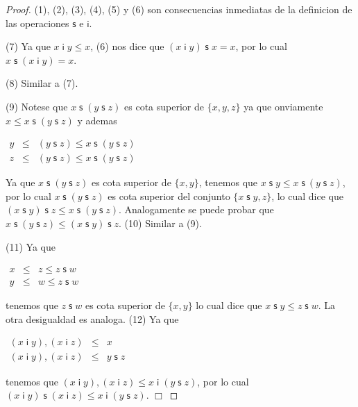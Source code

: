   \begin{proof}
    (1), (2), (3), (4), (5) y (6) son consecuencias inmediatas de la definicion de las operaciones \(\mathsf{s}\) e \(\mathsf{i}\).

    (7) Ya que \(x\mathsf{\;i\;}y\leq x\), (6) nos dice que \((x\mathsf{\;i\;}y)\; \mathsf{s}\;x=x\), por lo cual \(x\;\mathsf{s}\;(x\mathsf{\;i\;}y)=x\).

    (8) Similar a (7).

    (9) Notese que \(x\;\mathsf{s}\;(y\;\mathsf{s}\;z)\) es cota superior de \( \{x,y,z\}\) ya que onviamente \(x\leq x\;\mathsf{s}\;(y\;\mathsf{s}\;z)\) y ademas

    \(\displaystyle \begin{array}{rcl} y & \leq & (y\;\mathsf{s}\;z)\leq x\;\mathsf{s}\;(y\;\mathsf{s}\;z) \\ z & \leq & (y\;\mathsf{s}\;z)\leq x\;\mathsf{s}\;(y\;\mathsf{s}\;z) \end{array} \)

    Ya que \(x\;\mathsf{s}\;(y\;\mathsf{s}\;z)\) es cota superior de \(\{x,y\}\), tenemos que \(x\;\mathsf{s}\;y\leq x\;\mathsf{s}\ (y\;\mathsf{s}\;z)\), por lo cual \(x\;\mathsf{s}\;(y\;\mathsf{s}\;z)\) es cota superior del conjunto \(\{x\; \mathsf{s}\;y,z\}\), lo cual dice que \((x\;\mathsf{s}\;y)\;\mathsf{s}\;z\leq x\;\mathsf{s}\;(y\;\mathsf{s}\;z)\). Analogamente se puede probar que \(x\; \mathsf{s}\;(y\;\mathsf{s}\;z)\leq (x\;\mathsf{s}\;y)\;\mathsf{s}\;z\).
    (10) Similar a (9).

    (11) Ya que

    \(\displaystyle \begin{array}{rcl} x & \leq & z\leq z\;\mathsf{s}\;w \\ y & \leq & w\leq z\;\mathsf{s}\;w \end{array} \)

    tenemos que \(z\;\mathsf{s}\;w\) es cota superior de \(\{x,y\}\) lo cual dice que \(x\;\mathsf{s}\;y\leq z\;\mathsf{s}\;w\). La otra desigualdad es analoga.
    (12) Ya que

    \(\displaystyle \begin{array}{rcl} (x\mathsf{\;i\;}y),(x\mathsf{\;i\;}z) & \leq & x \\ (x\mathsf{\;i\;}y),(x\mathsf{\;i\;}z) & \leq & y\;\mathsf{s}\;z \end{array} \)

    tenemos que \((x\;\mathsf{i}\;y),(x\mathsf{\;i\;}z)\leq x\mathsf{\;i\;}(y\; \mathsf{s}\;z)\), por lo cual \((x\mathsf{\;i\;}y)\;\mathsf{s}\;(x\mathsf{\;i\; }z)\leq x\mathsf{\;i\;}(y\;\mathsf{s}\;z)\). \(\Box\)
  \end{proof}

